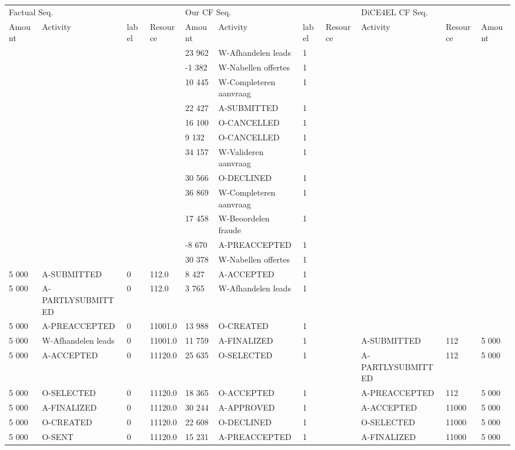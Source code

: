 \begin{tabular}{lllllllllll}
\toprule
\multicolumn{4}{l}{Factual Seq.} & \multicolumn{4}{l}{Our CF Seq.} & \multicolumn{3}{l}{DiCE4EL CF Seq.} \\
Amount & Activity & label & Resource & Amount & Activity & label & Resource & Activity & Resource & Amount \\
\midrule
 &  &  &  & 23 962 & W-Afhandelen leads & 1 &  &  &  &  \\
 &  &  &  & -1 382 & W-Nabellen offertes & 1 &  &  &  &  \\
 &  &  &  & 10 445 & W-Completeren aanvraag & 1 &  &  &  &  \\
 &  &  &  & 22 427 & A-SUBMITTED & 1 &  &  &  &  \\
 &  &  &  & 16 100 & O-CANCELLED & 1 &  &  &  &  \\
 &  &  &  & 9 132 & O-CANCELLED & 1 &  &  &  &  \\
 &  &  &  & 34 157 & W-Valideren aanvraag & 1 &  &  &  &  \\
 &  &  &  & 30 566 & O-DECLINED & 1 &  &  &  &  \\
 &  &  &  & 36 869 & W-Completeren aanvraag & 1 &  &  &  &  \\
 &  &  &  & 17 458 & W-Beoordelen fraude & 1 &  &  &  &  \\
 &  &  &  & -8 670 & A-PREACCEPTED & 1 &  &  &  &  \\
 &  &  &  & 30 378 & W-Nabellen offertes & 1 &  &  &  &  \\
5 000 & A-SUBMITTED & 0 & 112.0 & 8 427 & A-ACCEPTED & 1 &  &  &  &  \\
5 000 & A-PARTLYSUBMITTED & 0 & 112.0 & 3 765 & W-Afhandelen leads & 1 &  &  &  &  \\
5 000 & A-PREACCEPTED & 0 & 11001.0 & 13 988 & O-CREATED & 1 &  &  &  &  \\
5 000 & W-Afhandelen leads & 0 & 11001.0 & 11 759 & A-FINALIZED & 1 &  & A-SUBMITTED & 112 & 5 000 \\
5 000 & A-ACCEPTED & 0 & 11120.0 & 25 635 & O-SELECTED & 1 &  & A-PARTLYSUBMITTED & 112 & 5 000 \\
5 000 & O-SELECTED & 0 & 11120.0 & 18 365 & O-ACCEPTED & 1 &  & A-PREACCEPTED & 112 & 5 000 \\
5 000 & A-FINALIZED & 0 & 11120.0 & 30 244 & A-APPROVED & 1 &  & A-ACCEPTED & 11000 & 5 000 \\
5 000 & O-CREATED & 0 & 11120.0 & 22 608 & O-DECLINED & 1 &  & O-SELECTED & 11000 & 5 000 \\
5 000 & O-SENT & 0 & 11120.0 & 15 231 & A-PREACCEPTED & 1 &  & A-FINALIZED & 11000 & 5 000 \\

\end{tabular}
